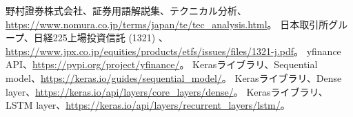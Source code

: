 \documentclass[a4paper, 11pt, titlepage]{jsarticle}
\begin{document}
\begin{thebibliography}{99}
   野村證券株式会社、証券用語解説集、テクニカル分析、\url{https://www.nomura.co.jp/terms/japan/te/tec_analysis.html}。
   日本取引所グループ、日経225上場投資信託 (1321) 、\url{https://www.jpx.co.jp/equities/products/etfs/issues/files/1321-j.pdf}。
   yfinance API、\url{https://pypi.org/project/yfinance/}。
   Kerasライブラリ、Sequential model、\url{https://keras.io/guides/sequential_model/}。
   Kerasライブラリ、Dense layer、\url{https://keras.io/api/layers/core_layers/dense/}。
   Kerasライブラリ、LSTM layer、\url{https://keras.io/api/layers/recurrent_layers/lstm/}。
  
\end{thebibliography}
\end{document}
